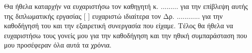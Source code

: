 \begin{acknowledgements}
Θα ήθελα καταρχήν να ευχαριστήσω τον καθηγητή κ. .........
για την επίβλεψη αυτής της διπλωματικής εργασίας [ ] ευχαριστώ ιδιαίτερα τον Δρ.
............ για την καθοδήγησή του και την εξαιρετική
συνεργασία που είχαμε. Τέλος θα ήθελα να ευχαριστήσω τους γονείς
μου για την καθοδήγηση και την ηθική συμπαράσταση που μου
προσέφεραν όλα αυτά τα χρόνια.
\end{acknowledgements}
